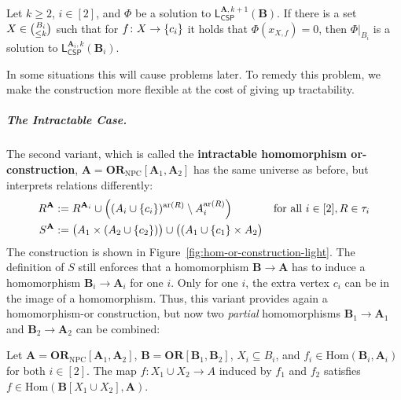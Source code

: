 \documentclass[a4paper,english, thm-restate]{lipics-v2021}
\newcommand{\defining}[1]{\textbf{#1}}
\DeclarePairedDelimiter\set{\lbrace}{\rbrace}
\newcommand{\sig}{\tau}
\newcommand{\arity}[1]{\operatorname*{ar}(#1)}
\newcommand{\StructA}{\mathbf{A}}
\newcommand{\StructB}{\mathbf{B}}
\newcommand{\restrict}[2]{#1|_{#2}}
\newcommand{\Hom}[2]{\mathrm{Hom}(#1,#2)}
\newcommand{\leqs}{\mathsf{L}}
\newcommand{\cspiso}[3]{\leqs^{#1,#2}_{\mathsf{CSP}}(#3)}
\newcommand{\ORNPC}[1]{\mathbf{OR}_\text{NPC}[#1]}
\newcommand{\OR}[1]{\mathbf{OR}[#1]}
\begin{document}
	\begin{lemma}[restate = integerSolutionWithLocalFixingSolvesBi, name = ]
		\label{lem:integerSolutionWithLocalFixingSolvesBi}
		Let $k \geq 2$, $i \in [2]$, 
		and $\Phi$ be a solution to $\cspiso{\StructA}{k+1}{\StructB}$.
		If there is a set $X\in \tbinom{B_i}{\leq k}$ such that
		for $f \colon X \to \set{c_i}$ it holds that
		$\Phi(x_{X,f}) = 0$,
		then $\restrict{\Phi}{B_i}$ is a solution to $\cspiso{\StructA_i}{k}{\StructB_i}$.
	\end{lemma}
	
	\noindent
	In some situations this will cause problems later.
	To remedy this problem,
	we make the construction more flexible at the cost
	of giving up tractability.
	
	
	
	\subparagraph{The Intractable Case.}
	
	The second variant, which is called the \defining{intractable homomorphism or-construction},
	$\StructA = \ORNPC{\StructA_1,\StructA_2}$
	has the same universe as before, but interprets relations differently:
	\begin{align*}
		R^\StructA & :=R^{\StructA_i}  \cup 
		\Big( (A_i \cup \set{c_i})^{\arity{R}} \setminus A_i^{\arity{R}}\Big)
		& \text{for all } i \in [2], R \in \sig_i\\
		S^\StructA & :=  \big( A_1 \times (A_2 \cup \set{c_{2}})\big) \cup \big((A_1 \cup \set{c_{1}} \times A_2\big)
	\end{align*}
	The construction is shown in Figure~\ref{fig:hom-or-construction-light}.
	The definition of $S$ still enforces that a homomorphism 
	$\StructB\to\StructA$ has to induce a homomorphism $\StructB_i\to\StructA_i$
	for one $i$. Only for one $i$, the extra vertex $c_i$ can be in the image of a homomorphism.
	Thus, this variant provides again a homomorphism-or construction,
	but now two \emph{partial} homomorphisms
	$\StructB_1 \to \StructA_1$ and $\StructB_2 \to \StructA_2$
	can be combined:
	
	\begin{lemma}[restate = homOrIntractableCompose, name = ]
		\label{lem:hom-or-intractable-compose}
		Let $\StructA=\ORNPC{\StructA_1,\StructA_2}$,
		$\StructB = \OR{\StructB_1,\StructB_2}$,
		$X_i \subseteq B_i$, and $f_i \in \Hom{\StructB_i}{\StructA_i}$ for both $i\in[2]$.
		The map $f\colon X_1\cup X_2 \to A$ induced by $f_1$ and $f_2$
		satisfies $f \in \Hom{\StructB[X_1\cup X_2]}{\StructA}$.
	\end{lemma}
	
\end{document}
